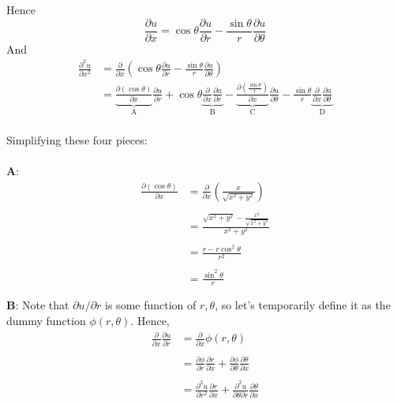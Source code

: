 \documentclass[12pt]{article}
\begin{document}
{Hence $$\frac{\partial u}{\partial x} = \cos \theta \frac{\partial u}{\partial r} - 
\frac{\sin \theta}{r} \frac{\partial u}{\partial \theta}$$
And 
\begin{align*}
\frac{\partial^2 u}{\partial x^2} &= \frac{\partial}{\partial x} \left( \cos \theta \frac{\partial u}{\partial r} - \frac{\sin \theta}{r} \frac{\partial u}{\partial \theta} \right) \\
&= \underbrace{ \frac{\partial (\cos \theta)}{\partial x} }_{\text{A}} \frac{\partial u}{\partial r} + \cos \theta \underbrace{ \frac{\partial}{\partial x} \frac{\partial u}{ \partial r} }_{\text{B}} - \underbrace{ \frac{\partial (\frac{\sin \theta}{r})}{\partial x} }_{\text{C}} \frac{\partial u}{\partial \theta} - \frac{\sin \theta}{r} \underbrace{ \frac{\partial }{\partial x}\frac{\partial u}{\partial \theta} }_{\text{D}}
\end{align*} \\
Simplifying these four pieces: \\ \\
\textbf{A}: \\
\begin{align*}
\frac{\partial (\cos \theta)}{\partial x} &= \frac{\partial}{\partial x} \left( \frac{x}{\sqrt{x^2 + y^2}} \right) \\ \\
&= \frac{\sqrt{x^2 + y^2} - \frac{x^2}{\sqrt{x^2 + y^2}}}{x^2 + y^2} \\ \\
&= \frac{r - r\cos^2 \theta}{r^2} \\ \\
&= \frac{\sin^2 \theta}{r} \\ \\
\end{align*}
\textbf{B}: Note that $\partial u / \partial r$ is some function of $r,\theta$, so let's temporarily define it as the dummy function $\phi(r,\theta)$. Hence, \\
\begin{align*}
\frac{\partial }{\partial x} \frac{\partial u}{\partial r}  &= \frac{\partial }{\partial x} \phi(r, \theta) \\ \\
 &=  \frac{\partial \phi}{\partial r} \frac{\partial r}{\partial x} + \frac{\partial \phi}{\partial \theta} \frac{\partial \theta}{\partial x} \\ \\
 &= \frac{\partial^2 u}{\partial r^2} \frac{\partial r}{\partial x} + \frac{\partial^2 u}{\partial \theta \partial r} \frac{\partial \theta}{\partial x} \\ \\

\end{align*}}
\end{document}
